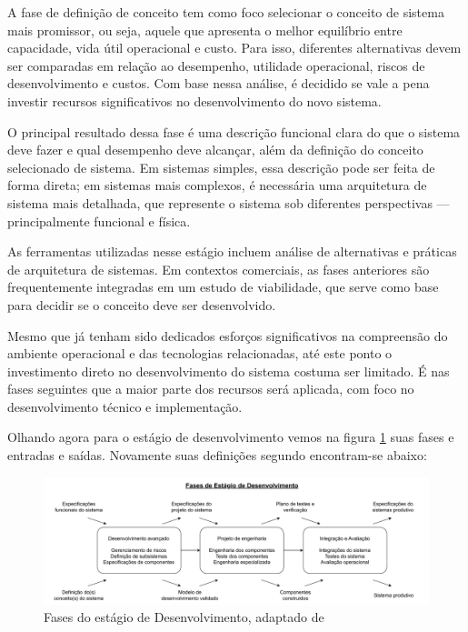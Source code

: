 	A fase de definição de conceito tem como foco selecionar o conceito de sistema mais promissor, ou seja, aquele que apresenta o melhor equilíbrio entre 
	capacidade, vida útil operacional e custo. Para isso, diferentes alternativas devem ser comparadas em relação ao desempenho, utilidade operacional, riscos 
	de desenvolvimento e custos. Com base nessa análise, é decidido se vale a pena investir recursos significativos no desenvolvimento do novo sistema.

	O principal resultado dessa fase é uma descrição funcional clara do que o sistema deve fazer e qual desempenho deve alcançar, além da definição do conceito 
	selecionado de sistema. Em sistemas simples, essa descrição pode ser feita de forma direta; em sistemas mais complexos, é necessária uma arquitetura de sistema 
	mais detalhada, que represente o sistema sob diferentes perspectivas — principalmente funcional e física.

	As ferramentas utilizadas nesse estágio incluem análise de alternativas e práticas de arquitetura de sistemas. Em contextos comerciais, as 
	fases anteriores são frequentemente integradas em um estudo de viabilidade, que serve como base para decidir se o conceito deve ser desenvolvido.

	Mesmo que já tenham sido dedicados esforços significativos na compreensão do ambiente operacional e das tecnologias relacionadas, até este ponto o 
	investimento direto no desenvolvimento do sistema costuma ser limitado. É nas fases seguintes que a maior parte dos recursos será aplicada, com foco no 
	desenvolvimento técnico e implementação.

	Olhando agora para o estágio de desenvolvimento vemos na figura \ref{fig:revisao:developmentStagePhases} suas fases e entradas e saídas. Novamente suas definições segundo \cite{kossiakoff2020systems} encontram-se abaixo:

	\begin{figure}[h]
		\centering
		\includegraphics[width=\textwidth]{./figuras/developmentPhases.pdf}
		\caption{Fases do estágio de Desenvolvimento, adaptado de \citep{kossiakoff2020systems}}
		\label{fig:revisao:developmentStagePhases}
	\end{figure}


